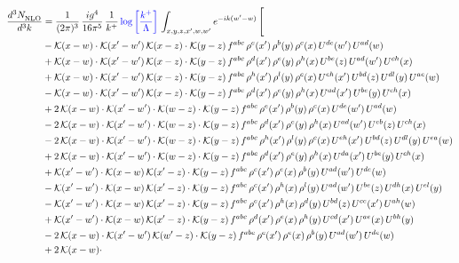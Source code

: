 \documentclass[9pt]{article}
\numberwithin{equation}{section}
\begin{document}
\begin{align}
     \frac{d^{3}N_{\rm NLO}^{\rm}}{d^{3}k}  & = \frac{1}{(2\pi)^{3}}\, \frac{ig^{4}}{16\pi^{5}}\, \frac{1}{k^{+}}\,{\color{blue}\log{\left[\frac{k^{+}}{\Lambda}\right]}}\, \int_{x,y,z,x^{\prime},w,w^{\prime}}e^{-ik(w^{\prime}-w)}\, \Bigg[\notag \\ & -\mathcal{K}(x-w)\cdot \mathcal{K}(x'-w')\, \mathcal{K}(x-z)\cdot \mathcal{K}(y-z)\, f^{abc}\, \rho^{e}(x')\,\rho^{b}(y)\,\rho^{c}(x)\,U^{de}(w')\,U^{ad}(w)\notag \\ & + \mathcal{K}(x-w)\cdot \mathcal{K}(x'-w')\, \mathcal{K}(x-z)\cdot \mathcal{K}(y-z)\, f^{abc}\, \rho^{d}(x')\,\rho^{e}(y)\,\rho^{h}(x)\,U^{be}(z)\,U^{ad}(w')\,U^{ch}(x)\notag \\ & + \mathcal{K}(x-w)\cdot \mathcal{K}(x'-w')\, \mathcal{K}(x-z)\cdot \mathcal{K}(y-z)\, f^{abc}\, \rho^{h}(x')\,\rho^{l}(y)\,\rho^{c}(x)\,U^{eh}(x')\,U^{bd}(z)\,U^{dl}(y)\,U^{ae}(w)\notag \\ & -\mathcal{K}(x-w)\cdot \mathcal{K}(x'-w')\, \mathcal{K}(x-z)\cdot \mathcal{K}(y-z)\, f^{abc}\, \rho^{d}(x')\,\rho^{e}(y)\,\rho^{h}(x)\,U^{ad}(x')\,U^{be}(y)\,U^{ch}(x)\notag \\ & + 2\,\mathcal{K}(x-w)\cdot \mathcal{K}(x'-w')\cdot \mathcal{K}(w-z)\cdot \mathcal{K}(y-z)\, f^{abc}\, \rho^{e}(x')\,\rho^{b}(y)\,\rho^{c}(x)\,U^{de}(w')\,U^{ad}(w)\notag \\ & - 2\,\mathcal{K}(x-w)\cdot \mathcal{K}(x'-w')\cdot \mathcal{K}(w-z)\cdot \mathcal{K}(y-z)\, f^{abc}\, \rho^{d}(x')\,\rho^{e}(y)\,\rho^{h}(x)\,U^{ad}(w')\,U^{eb}(z)\,U^{ch}(x)\notag \\ & - 2\,\mathcal{K}(x-w)\cdot \mathcal{K}(x'-w')\cdot \mathcal{K}(w-z)\cdot \mathcal{K}(y-z)\, f^{abc}\, \rho^{h}(x')\,\rho^{l}(y)\,\rho^{c}(x)\,U^{eh}(x')\,U^{bd}(z)\,U^{dl}(y)\,U^{ea}(w)\notag \\ &  + 2\,\mathcal{K}(x-w)\cdot \mathcal{K}(x'-w')\cdot \mathcal{K}(w-z)\cdot \mathcal{K}(y-z)\, f^{abc}\, \rho^{d}(x')\,\rho^{e}(y)\,\rho^{h}(x)\,U^{da}(x')\,U^{be}(y)\,U^{ch}(x)\notag \\ & + \mathcal{K}(x'-w')\cdot \mathcal{K}(x-w)\, \mathcal{K}(x'-z)\cdot \mathcal{K}(y-z)\, f^{abc}\,\rho^{c}(x')\,\rho^{e}(x)\,\rho^{b}(y)\, U^{ad}(w')\,U^{de}(w)\notag \\ & -\mathcal{K}(x'-w')\cdot \mathcal{K}(x-w)\, \mathcal{K}(x'-z)\cdot \mathcal{K}(y-z)\, f^{abc}\,\rho^{c}(x')\,\rho^{h}(x)\,\rho^{l}(y)\, U^{ad}(w')\,U^{be}(z)\,U^{dh}(x)\,U^{el}(y)\notag \\ & -\mathcal{K}(x'-w')\cdot \mathcal{K}(x-w)\, \mathcal{K}(x'-z)\cdot \mathcal{K}(y-z)\, f^{abc}\,\rho^{e}(x')\,\rho^{h}(x)\,\rho^{d}(y)\, U^{bd}(z)\,U^{ce}(x')\,U^{ah}(w)\notag \\ & +\mathcal{K}(x'-w')\cdot \mathcal{K}(x-w)\, \mathcal{K}(x'-z)\cdot \mathcal{K}(y-z)\, f^{abc}\,\rho^{d}(x')\,\rho^{e}(x)\,\rho^{h}(y)\, U^{cd}(x')\,U^{ae}(x)\,U^{bh}(y)\notag \\ & -2\, \mathcal{K}(x-w)\cdot \mathcal{K}(x'-w')\, \mathcal{K}(w'-z)\cdot \mathcal{K}(y-z)\, f^{abc}\,\rho^{c}(x')\,\rho^{e}(x)\,\rho^{b}(y)\,U^{ad}(w')\,U^{de}(w)\notag \\ & +2\, \mathcal{K}(x-w)\cdot 
\end{align}
\end{document}
